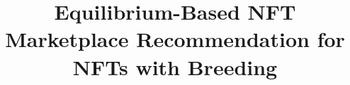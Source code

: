 \documentclass[conference]{IEEEtran}
\newcommand{\1}[1]{\mathds{1}\left[#1\right]}
\theoremstyle{plain}
\begin{document}
\title{Equilibrium-Based NFT Marketplace Recommendation for NFTs with Breeding}

\author{}



% 
\end{document}
